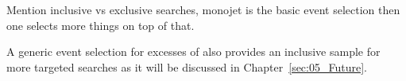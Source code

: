 Mention inclusive vs exclusive searches, monojet is the basic event selection then one selects more things on top of that. 

A generic event selection for excesses of \MET also provides an inclusive sample for more targeted searches as it will be discussed in Chapter~\ref{sec:05_Future}. 
